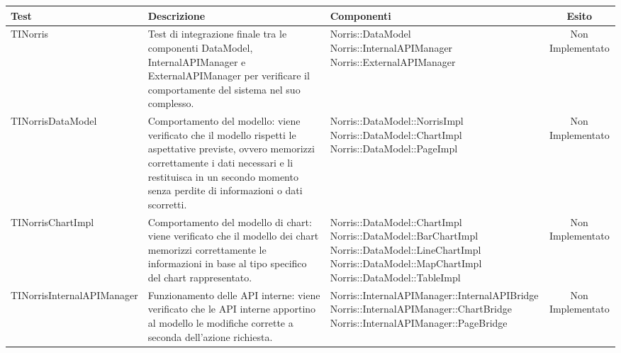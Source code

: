 \begin{table}[H]
	\begin{center}
		\begin{longtabu}{| X | X | X | c |}
			\hline
			Test 					& Descrizione				& Componenti				 & Esito 					\\ \hline




	TINorris
	&
Test di integrazione finale tra le componenti DataModel, InternalAPIManager e ExternalAPIManager per verificare il comportamente del sistema nel suo complesso.
& \parbox[t]{0.4\textwidth}{
Norris::DataModel\\
Norris::InternalAPIManager\\
Norris::ExternalAPIManager}
			& Non Implementato
			\\ \hline



	TINorrisDataModel
	&
Comportamento del modello: viene verificato che il modello rispetti le aspettative previste, ovvero memorizzi correttamente i dati necessari e li restituisca in un secondo momento senza perdite di informazioni o dati scorretti.
& \parbox[t]{0.4\textwidth}{
Norris::DataModel::NorrisImpl\\
Norris::DataModel::ChartImpl\\
Norris::DataModel::PageImpl}
			& Non Implementato
			\\ \hline



	TINorrisChartImpl
	&
Comportamento del modello di chart: viene verificato che il modello dei chart memorizzi correttamente le informazioni in base al tipo specifico del chart rappresentato.
& \parbox[t]{0.4\textwidth}{
Norris::DataModel::ChartImpl\\
Norris::DataModel::BarChartImpl\\
Norris::DataModel::LineChartImpl\\
Norris::DataModel::MapChartImpl\\
Norris::DataModel::TableImpl}
			& Non Implementato
			\\ \hline



	TINorrisInternalAPIManager
	&
Funzionamento delle API interne: viene verificato che le API interne apportino al modello le modifiche corrette a seconda dell'azione richiesta.
& \parbox[t]{0.4\textwidth}{
Norris::InternalAPIManager::InternalAPIBridge\\
Norris::InternalAPIManager::ChartBridge\\
Norris::InternalAPIManager::PageBridge}
			& Non Implementato
			\\ \hline




\end{longtabu}
\end{center}
\end{table}
